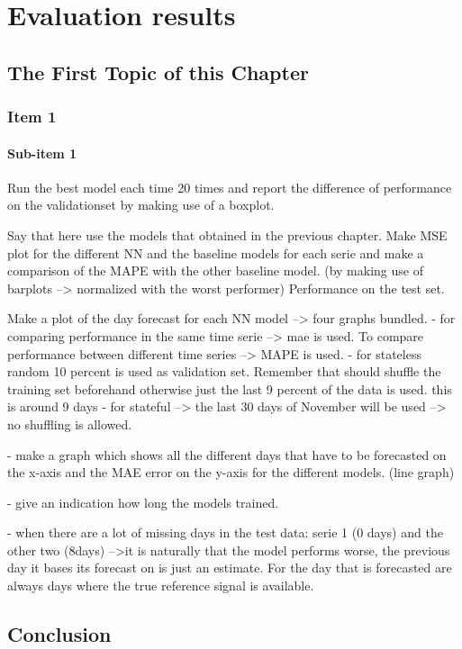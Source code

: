 \chapter{Evaluation results}
\label{cha:Evaluating results}


\section{The First Topic of this Chapter}
\subsection{Item 1}
\subsubsection{Sub-item 1}

Run the best model each time 20 times and report the difference of  performance on the validationset by making use of a boxplot. 


Say that here use the models that obtained in the previous chapter. Make MSE plot for the different NN and the baseline models for each serie and make a comparison of the MAPE with the other baseline model. (by making use of barplots --> normalized with the worst performer) Performance on the test set. 

Make a plot of the day forecast for each NN model --> four graphs bundled. 
- for comparing performance in the same time serie --> mae is used. To compare performance between different time series --> MAPE is used. 
- for stateless random 10 percent is used as validation set. Remember that should shuffle the training set beforehand otherwise just the last 9 percent of the data is used. this is around 9 days
- for stateful --> the last 30 days of November will be used --> no shuffling is allowed.

- make a graph which shows all the different days that have to be forecasted on the x-axis and the MAE error on the y-axis for the different models. (line graph)

- give an indication how long the models trained.

- when there are a lot of missing days in the test data: serie 1 (0 days) and the other two (8days) -->it is naturally that the model performs worse, the previous day it bases its forecast on is just an estimate. For the day that is forecasted are always days where the true reference signal is available. 


\section{Conclusion}
\lipsum[86-88]

